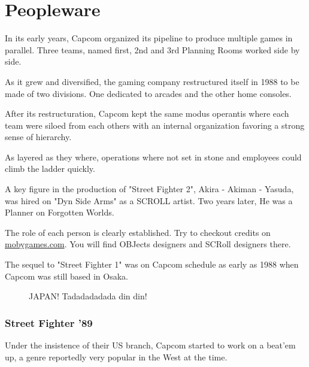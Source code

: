 \chapter{Peopleware} 

In its early years, Capcom organized its pipeline to produce multiple games in parallel. Three teams, named first, 2nd and 3rd Planning Rooms worked side by side. 

As it grew and diversified, the gaming company restructured itself in 1988 to be made of two divisions. One dedicated to arcades and the other home consoles. 

After its restructuration, Capcom kept the same modus operantis where each team were siloed from each others with an internal organization favoring a strong sense of hierarchy. 




As layered as they where, operations where not set in stone and employees could climb the ladder quickly. 

A key figure in the production of "Street Fighter 2", Akira - Akiman - Yasuda, was hired on "Dyn Side Arms" as a SCROLL artist. Two years later, He was a Planner on Forgotten Worlds.

\begin{trivia}
The role of each person is clearly established. Try to checkout credits on \url{mobygames.com}. You will find OBJects designers and SCRoll designers there.
\end{trivia}

The sequel to "Street Fighter 1" was on Capcom schedule as early as 1988 when Capcom was still based in Osaka.

\begin{figure}[H]
\caption*{JAPAN! Tadadadadada din din!}
\end{figure}








\subsection{Street Fighter '89}
Under the insistence of their US branch, Capcom started to work on a beat'em up, a genre reportedly very popular in the West at the time.

